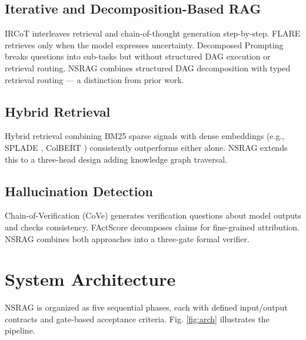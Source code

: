 \documentclass[conference]{IEEEtran}
\begin{document}
\subsection{Iterative and Decomposition-Based RAG}
IRCoT \cite{trivedi2022interleaving} interleaves retrieval and chain-of-thought generation step-by-step. FLARE \cite{jiang2023flare} retrieves only when the model expresses uncertainty. Decomposed Prompting \cite{khot2022decomposed} breaks questions into sub-tasks but without structured DAG execution or retrieval routing. NSRAG combines structured DAG decomposition with typed retrieval routing — a distinction from prior work.

\subsection{Hybrid Retrieval}
Hybrid retrieval combining BM25 sparse signals with dense embeddings (e.g., SPLADE \cite{formal2021splade}, ColBERT \cite{khattab2020colbert}) consistently outperforms either alone. NSRAG extends this to a three-head design adding knowledge graph traversal.

\subsection{Hallucination Detection}
Chain-of-Verification (CoVe) \cite{dhuliawala2023cove} generates verification questions about model outputs and checks consistency. FActScore \cite{min2023factscore} decomposes claims for fine-grained attribution. NSRAG combines both approaches into a three-gate formal verifier.

\section{System Architecture}

NSRAG is organized as five sequential phases, each with defined input/output contracts and gate-based acceptance criteria. Fig. \ref{fig:arch} illustrates the pipeline.
\end{document}
